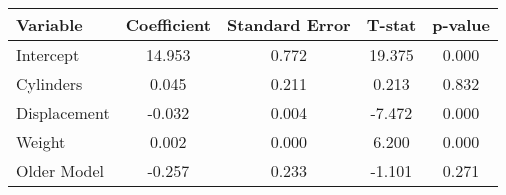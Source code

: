 \begin{tabular}{lcccc}

\hline\hline
Variable&Coefficient&Standard Error&T-stat&p-value\\\hline
Intercept&14.953&0.772&19.375&0.000\\
Cylinders&0.045&0.211&0.213&0.832\\
Displacement&-0.032&0.004&-7.472&0.000\\
Weight&0.002&0.000&6.200&0.000\\
Older Model&-0.257&0.233&-1.101&0.271\\
\hline
\end{tabular}
